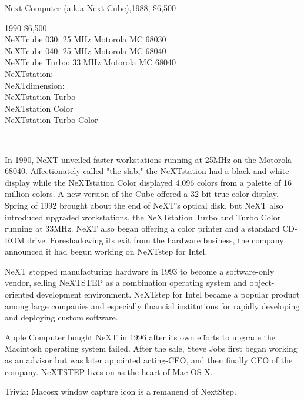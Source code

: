 Next Computer (a.k.a Next Cube),1988, \$6,500\\
\par
1990 \$6,500\\
NeXTcube 030: 25 MHz Motorola MC 68030\\
NeXTcube 040: 25 MHz Motorola MC 68040\\
NeXTcube Turbo: 33 MHz Motorola MC 68040\\
NeXTstation:\\
NeXTdimension:\\
NeXTstation Turbo\\
NeXTstation Color\\
NeXTstation Turbo Color\\
\par
{}
\par
{}\\
\begin{minipage}{\textwidth}
 
\end{minipage}
\par
In 1990, NeXT unveiled faster workstations running at 25MHz on the Motorola 68040. Affectionately called "the slab," the NeXTstation had a black and white display while the NeXTstation Color displayed 4,096 colors from a palette of 16 million colors. A new version of the Cube offered a 32-bit true-color display.
Spring of 1992 brought about the end of NeXT's optical disk, but NeXT also introduced upgraded workstations, the NeXTstation Turbo and Turbo Color running at 33MHz. NeXT also began offering a color printer and a standard CD-ROM drive. Foreshadowing its exit from the hardware business, the company announced it had begun working on NeXTstep for Intel.\\
\par
{}
\par
NeXT stopped manufacturing hardware in 1993 to become a software-only vendor, selling NeXTSTEP as a combination operating system and object-oriented development environment. NeXTstep for Intel became a popular product among large companies and especially financial institutions for rapidly developing and deploying custom software. \\
\par
Apple Computer bought NeXT in 1996 after its own efforts to upgrade the Macintosh operating system failed.  After the sale, Steve Jobs first began working as an advisor but was later appointed acting-CEO, and then finally CEO of the company.  NeXTSTEP lives on as the heart of Mac OS X.\\
\par
{}
\par
{}

\par
{}
\par
Trivia: Macosx window capture icon is a remanend of NextStep.\\
